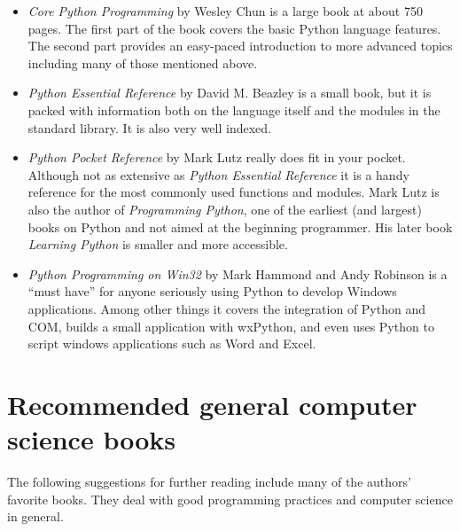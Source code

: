 \begin{itemize}

\item {\em Core Python Programming} by Wesley Chun is a large book 
at about 750 pages.  The first part of the book covers the basic Python
language features.  The second part provides an easy-paced introduction
to more advanced topics including many of those mentioned above.

\item {\em Python Essential Reference} by David M. Beazley is a small
book, but it is packed with information both on the
language itself and the modules in the standard library.  It is also
very well indexed.

\item {\em Python Pocket Reference} by Mark Lutz really does fit in 
your pocket.  Although not as extensive as {\em Python Essential
Reference} it is a handy reference for the most commonly used functions
and modules.  Mark Lutz is also the author of {\em Programming Python},
one of the earliest (and largest) books on Python and not aimed at the
beginning programmer.  His later book {\em Learning Python} is smaller
and more accessible.

\item {\em Python Programming on Win32} by Mark Hammond and Andy 
Robinson is a ``must have'' for anyone seriously using Python to develop
Windows applications.  Among other things it covers the integration of
Python and COM, builds a small application with wxPython, and even
uses Python to script windows applications such as Word and Excel.

\end{itemize}

\section{Recommended general computer science books}

The following suggestions for further reading include many of the
authors' favorite books.  They deal with good programming practices
and computer science in general.

